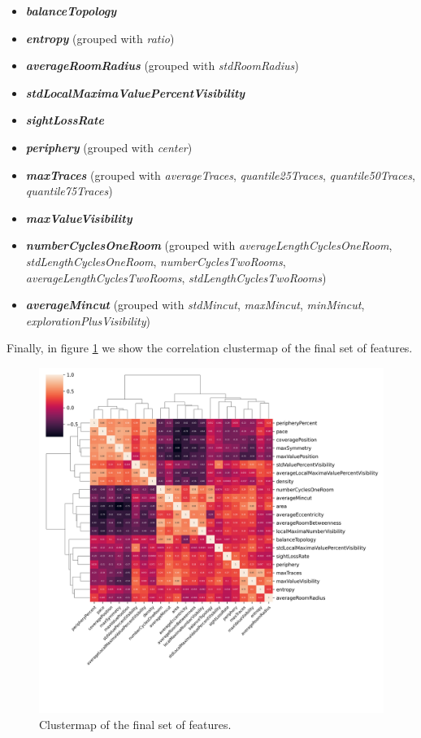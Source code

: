 \begin{itemize}
    \item \textbf{\textit{balanceTopology}}
    \item \textbf{\textit{entropy}} (grouped with \textit{ratio})
    \item \textbf{\textit{averageRoomRadius}} (grouped with \textit{stdRoomRadius})
    \item \textbf{\textit{stdLocalMaximaValuePercentVisibility}}
    \item \textbf{\textit{sightLossRate}}
    \item \textbf{\textit{periphery}} (grouped with \textit{center})
    \item \textbf{\textit{maxTraces}} (grouped with \textit{averageTraces}, \textit{quantile25Traces}, \textit{quantile50Traces}, \textit{quantile75Traces})
    \item \textbf{\textit{maxValueVisibility}}
    \item \textbf{\textit{numberCyclesOneRoom}} (grouped with \textit{averageLengthCyclesOneRoom}, \textit{stdLengthCyclesOneRoom}, \textit{numberCyclesTwoRooms}, \textit{averageLengthCyclesTwoRooms}, \textit{stdLengthCyclesTwoRooms})
    \item \textbf{\textit{averageMincut}} (grouped with \textit{stdMincut}, \textit{maxMincut}, \textit{minMincut}, \textit{explorationPlusVisibility})
\end{itemize}

Finally, in figure \cref{fig:correlation_clustermap_final} we show the correlation clustermap of the final set of features.

\begin{figure}[hbt!]
    \centering
    \includegraphics[width=1.0\textwidth]{images/covariance_clustermap_final.png}
    \caption{Clustermap of the final set of features.}
    \label{fig:correlation_clustermap_final}
\end{figure}

